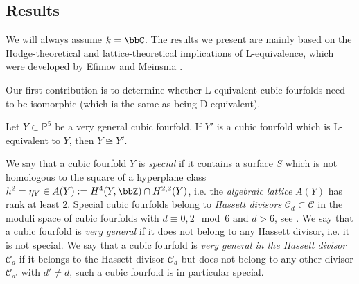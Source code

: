 \documentclass{amsart}
\begin{document}
\subsection{Results}
We will always assume \(k=\bbC\). The results we present are mainly based on the Hodge-theoretical and lattice-theoretical implications of L-equivalence, which were developed by Efimov \cite{efimov2018some} and Meinsma \cite{meinsma2024equivalence}.

Our first contribution is to determine whether L-equivalent cubic fourfolds need to be isomorphic (which is the same as being D-equivalent).






\begin{theorem}\label{thm:intro_very_general_cubic}
    Let \(Y\subset \mathbb{P}^5\) be a very general cubic fourfold. If \(Y'\) is a cubic fourfold which is L-equivalent to \(Y\), then \(Y\cong Y'\).
\end{theorem}
We say that a cubic fourfold \(Y\) is \textit{special} if it contains a surface \(S\) which is not homologous to the square of a hyperplane class \(h^2=\eta_Y\in A(Y):= H^4(Y,\bbZ)\cap H^{2,2}(Y)\), i.e. the \textit{algebraic lattice} \(A(Y)\) has rank at least \(2\). Special cubic fourfolds belong to \textit{Hassett divisors} \(\mathcal{C}_d\subset \mathcal{C}\) in the moduli space of cubic fourfolds with \(d\equiv 0,2 \mod 6\) and \(d>6\), see \cite{hassett2000special}. We say that a cubic fourfold is \emph{very general} if it does not belong to any Hassett divisor, i.e. it is not special. We say that a cubic fourfold is \emph{very general in the Hassett divisor \(\mathcal{C}_d\)} if it belongs to the Hassett divisor \(\mathcal{C}_d\) but does not belong to any other divisor \(\mathcal{C}_{d'}\) with \(d'\not= d\), such a cubic fourfold is in particular special.
\end{document}
